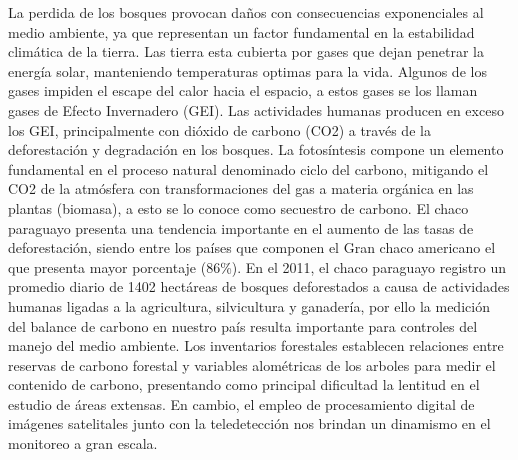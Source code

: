 La perdida de los bosques provocan da\~{n}os con consecuencias exponenciales al medio ambiente, ya que representan un factor fundamental en la estabilidad clim\'atica de la tierra. Las tierra esta cubierta por gases que dejan penetrar la energ\'ia solar, manteniendo temperaturas optimas para la vida. Algunos de los gases impiden el escape del calor hacia el espacio, a estos gases se los llaman gases de Efecto Invernadero (GEI). Las actividades humanas producen en exceso los GEI, principalmente con di\'oxido de carbono (CO2) a trav\'es de la deforestaci\'on y degradaci\'on en los bosques. La fotos\'intesis compone un elemento fundamental en el proceso natural denominado ciclo del carbono, mitigando el CO2 de la atm\'osfera con transformaciones del gas a materia org\'anica en las plantas (biomasa), a esto se lo conoce como secuestro de carbono. El chaco paraguayo presenta una tendencia importante en el aumento de las tasas de deforestaci\'on, siendo entre los pa\'ises que componen el Gran chaco americano el que presenta mayor porcentaje (86\%). 
En el 2011, el chaco paraguayo registro un promedio diario de 1402 hect\'areas de bosques deforestados a causa de actividades humanas ligadas a la agricultura, silvicultura y ganadería, por ello la medici\'on del balance de carbono en nuestro pa\'is resulta importante para controles del manejo del medio ambiente. Los inventarios forestales establecen relaciones entre reservas de carbono forestal y variables alom\'etricas de los arboles  para medir el contenido de carbono, presentando como principal dificultad la lentitud en el estudio de \'areas extensas. En cambio, el empleo de procesamiento digital de im\'agenes satelitales junto con la teledetecci\'on nos brindan un dinamismo en el monitoreo a gran escala.